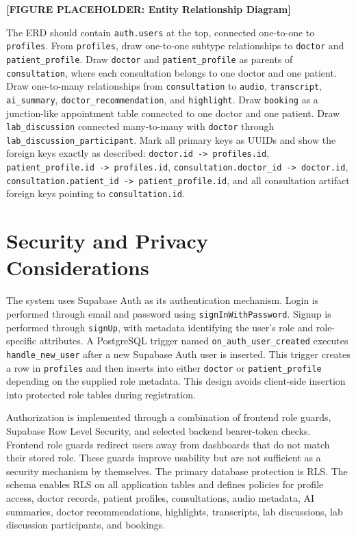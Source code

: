 \noindent\textbf{[FIGURE PLACEHOLDER: Entity Relationship Diagram]}

The ERD should contain \texttt{auth.users} at the top, connected one-to-one to \texttt{profiles}. From \texttt{profiles}, draw one-to-one subtype relationships to \texttt{doctor} and \texttt{patient\_profile}. Draw \texttt{doctor} and \texttt{patient\_profile} as parents of \texttt{consultation}, where each consultation belongs to one doctor and one patient. Draw one-to-many relationships from \texttt{consultation} to \texttt{audio}, \texttt{transcript}, \texttt{ai\_summary}, \texttt{doctor\_recommendation}, and \texttt{highlight}. Draw \texttt{booking} as a junction-like appointment table connected to one doctor and one patient. Draw \texttt{lab\_discussion} connected many-to-many with \texttt{doctor} through \texttt{lab\_discussion\_participant}. Mark all primary keys as UUIDs and show the foreign keys exactly as described: \texttt{doctor.id -> profiles.id}, \texttt{patient\_profile.id -> profiles.id}, \texttt{consultation.doctor\_id -> doctor.id}, \texttt{consultation.patient\_id -> patient\_profile.id}, and all consultation artifact foreign keys pointing to \texttt{consultation.id}.

\section{Security and Privacy Considerations}
\label{sec:security-privacy}

The system uses Supabase Auth as its authentication mechanism. Login is performed through email and password using \texttt{signInWithPassword}. Signup is performed through \texttt{signUp}, with metadata identifying the user's role and role-specific attributes. A PostgreSQL trigger named \texttt{on\_auth\_user\_created} executes \texttt{handle\_new\_user} after a new Supabase Auth user is inserted. This trigger creates a row in \texttt{profiles} and then inserts into either \texttt{doctor} or \texttt{patient\_profile} depending on the supplied role metadata. This design avoids client-side insertion into protected role tables during registration.

Authorization is implemented through a combination of frontend role guards, Supabase Row Level Security, and selected backend bearer-token checks. Frontend role guards redirect users away from dashboards that do not match their stored role. These guards improve usability but are not sufficient as a security mechanism by themselves. The primary database protection is RLS. The schema enables RLS on all application tables and defines policies for profile access, doctor records, patient profiles, consultations, audio metadata, AI summaries, doctor recommendations, highlights, transcripts, lab discussions, lab discussion participants, and bookings.

